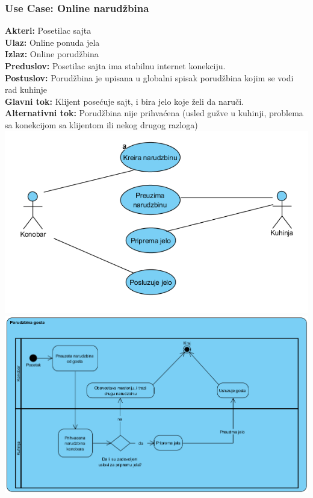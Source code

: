 \documentclass{article}
\begin{document}
\subsubsection{\textbf{Use Case:} Online narudžbina}
\textbf{Akteri:} Posetilac sajta\\
\textbf{Ulaz:} Online ponuda jela\\
\textbf{Izlaz:} Online porudžbina\\
\textbf{Preduslov:} Posetilac sajta ima stabilnu internet konekciju.\\
\textbf{Postuslov:} Porudžbina je upisana u globalni spisak porudžbina kojim se vodi rad kuhinje\\
\textbf{Glavni tok:} Klijent posećuje sajt, i bira jelo koje želi da naruči.\\
\textbf{Alternativni tok:} Porudžbina nije prihvaćena (usled gužve u kuhinji, problema sa konekcijom sa klijentom ili nekog drugog razloga)\\
  
  \includegraphics[width=\textwidth]{SU_7_konobar_kuhinja.png}
  \includegraphics[width=\textwidth]{SU_7_porudzbina.png}
\end{document}
